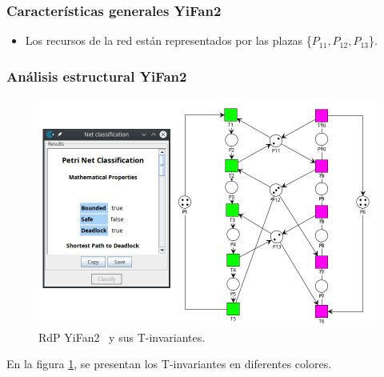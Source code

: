 \subsubsection{Características generales YiFan2}
\begin{itemize}
    \item Los recursos de la red están representados por las plazas \{$P_{11},P_{12},P_{13}$\}.
\end{itemize}

\subsubsection{Análisis estructural YiFan2}
\hfill
\begin{figure}[H]
	\centering
	\includegraphics[width=\textwidth]{Figures/testing/yifan2_tinvariantes.png}
	\caption[RdP YiFan2 y sus T-invariantes.]{RdP YiFan2 \footnotemark \ y sus T-invariantes.}
	\label{fig:yifan2_invariantes}
 \end{figure} 

En la figura \ref{fig:yifan2_invariantes}, se presentan los T-invariantes en diferentes colores. \\


